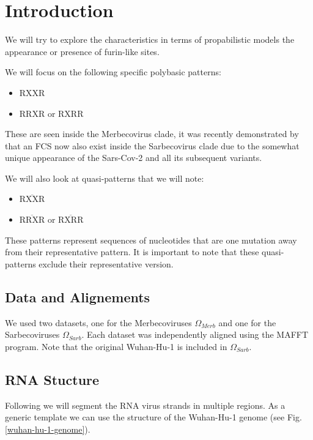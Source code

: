 \documentclass[pdflatex,sn-basic,iicol]{sn-jnl}%
\begin{document}



\maketitle

\section{Introduction}\label{intro}
We will try to explore the characteristics in terms of propabilistic models the appearance or presence of furin-like sites. 

We will focus on the following specific polybasic patterns:
\begin{itemize}
    \item $\text{RXXR}$
    \item $\text{RRXR}$ or $\text{RXRR}$
\end{itemize}
These are seen inside the Merbecovirus clade, it was recently demonstrated by \cite{COUTARD2020104742} that an FCS now also exist inside 
the Sarbecovirus clade due to the somewhat unique appearance of the Sars-Cov-2 and all its subsequent variants.

We will also look at quasi-patterns that we will note:
\begin{itemize}
    \item $\overline{\text{RXXR}}$
    \item $\overline{\text{RRXR}}$ or $\overline{\text{RXRR}}$
\end{itemize}
These patterns represent sequences of nucleotides that are one mutation away from their representative pattern.
It is important to note that these quasi-patterns exclude their representative version.

\subsection{Data and Alignements}
We used two datasets, one for the Merbecoviruses $\Omega_{Merb}$ and one for the Sarbecoviruses $\Omega_{Sarb}$. 
Each dataset was independently aligned using the MAFFT program.
Note that the original Wuhan-Hu-1 is included in $\Omega_{Sarb}$.

\subsection{RNA Stucture}
Following \cite{WU2021102115} we will segment the RNA virus strands in multiple regions. 
As a generic template we can use the structure of the Wuhan-Hu-1 genome (see Fig.\ref{wuhan-hu-1-genome}). 
\end{document}
